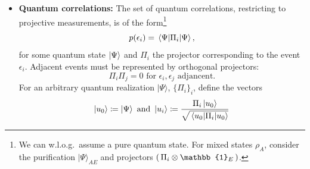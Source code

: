 \begin{itemize}
    \item \textbf{Quantum correlations:}
    The set of quantum correlations, restricting to projective measurements, is of the form\footnote{We can w.l.o.g.\ assume a pure quantum state. For mixed states $\rho_A$, consider the purification $\vert\Psi\rangle_{AE}$ and projectors $(\thinspace\Pi_i\otimes\mathbb{1}_E\thinspace)$.} \begin{equation*}
    p(\epsilon_i)=\expval{\Pi_i}{\Psi},
    \end{equation*}
    for some quantum state $\ket{\Psi}$ and $\Pi_{i}$ the projector corresponding to the event $\epsilon_i$. Adjacent events must be represented by orthogonal projectors:
    \begin{equation*}
        \Pi_{i}\Pi_{j} = 0 \text{ for } \epsilon_i, \epsilon_j \text{ adjancent}.
    \end{equation*}
    For an arbitrary quantum realization $\vert \Psi\rangle$, $\{\Pi_{i}\}_i$, define the vectors
    \[\ket{u_0} \coloneqq \ket{\Psi}\text{ and }\ket{u_i} \coloneqq \frac{\Pi_{i} \ket{u_0}}{\sqrt{\expval{\Pi_i}{u_0}}} \]
    

\end{itemize}
